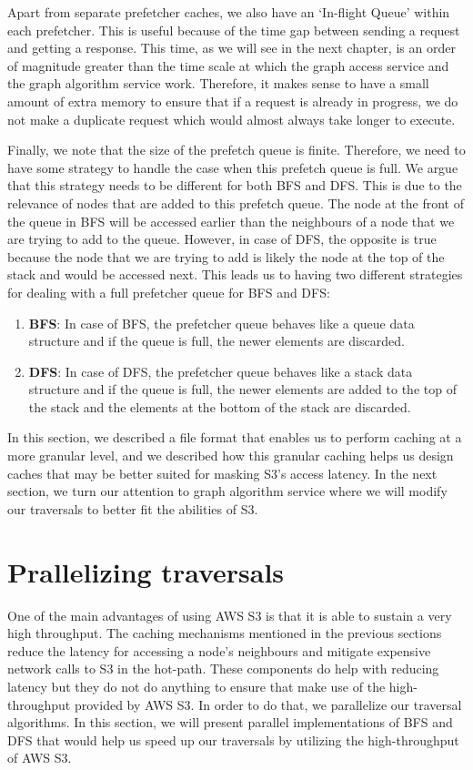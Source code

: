 \medskip
Apart from separate prefetcher caches, we also have an `In-flight Queue' within
each prefetcher. This is useful because of the time gap between sending a
request and getting a response. This time, as we will see in the next chapter,
is an order of magnitude greater than the time scale at which the graph access
service and the graph algorithm service work. Therefore, it makes sense to have
a small amount of extra memory to ensure that if a request is already in
progress, we do not make a duplicate request which would almost always take
longer to execute. 

\medskip
Finally, we note that the size of the prefetch queue is finite. Therefore, we
need to have some strategy to handle the case when this prefetch queue is full.
We argue that this strategy needs to be different for both BFS and DFS. This is
due to the relevance of nodes that are added to this prefetch queue. The node at
the front of the queue in BFS will be accessed earlier than the neighbours of a
node that we are trying to add to the queue. However, in case of DFS, the
opposite is true because the node that we are trying to add is likely the node
at the top of the stack and would be accessed next. This leads us to having two
different strategies for dealing with a full prefetcher queue for BFS and DFS:
\begin{enumerate}
    \item \textbf{BFS}: In case of BFS, the prefetcher queue behaves like a
        queue data structure and if the queue is full, the newer elements are
        discarded.
    \item \textbf{DFS}: In case of DFS, the prefetcher queue behaves like a
        stack data structure and if the queue is full, the newer elements
        are added to the top of the stack and the elements at the bottom of the
        stack are discarded.
\end{enumerate}

\bigskip
In this section, we described a file format that enables us to perform caching
at a more granular level, and we described how this granular caching helps us
design caches that may be better suited for masking S3's access latency.
In the next section, we turn our
attention to graph algorithm service where we will modify our traversals to
better fit the abilities of S3.


\section{Prallelizing traversals}\label{sec:parallelAlgorithms}
One of the main advantages of using AWS S3 is that it is able to sustain a very
high throughput. The caching mechanisms mentioned in the previous sections
reduce the latency for accessing a node's neighbours and mitigate expensive
network calls to S3 in the hot-path. These components do help with reducing
latency but they do not do anything to ensure that make use of the
high-throughput provided by AWS S3. In order to do that, we parallelize our
traversal algorithms. In this section, we will present parallel implementations
of BFS and DFS that would help us speed up our traversals by utilizing the
high-throughput of AWS S3.


